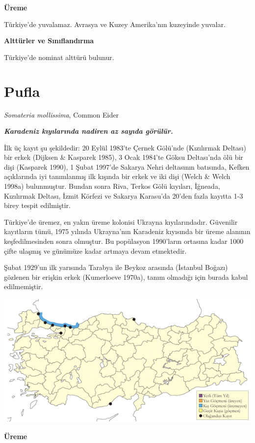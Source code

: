 \documentclass[
  letterpaper,
  DIV=11,
  numbers=noendperiod]{scrreprt}
\begin{document}
\textbf{Üreme}

Türkiye'de yuvalamaz. Avrasya ve Kuzey Amerika'nın kuzeyinde yuvalar.

\textbf{Alttürler ve Sınıflandırma}

Türkiye'de nominat alttürü bulunur.

\section{Pufla}\label{pufla}

\emph{Somateria mollissima}, Common Eider

\textbf{\emph{Karadeniz kıyılarında nadiren az sayıda görülür.}}

İlk üç kayıt şu şekildedir: 20 Eylül 1983'te Çernek Gölü'nde (Kızılırmak
Deltası) bir erkek (Dijksen \& Kasparek 1985), 3 Ocak 1984'te Göksu
Deltası'nda ölü bir dişi (Kasparek 1990), 1 Şubat 1997'de Sakarya Nehri
deltasının batısında, Kefken açıklarında iyi tanımlanmış ilk kışında bir
erkek ve iki dişi (Welch \& Welch 1998a) bulunmuştur. Bundan sonra Riva,
Terkos Gölü kıyıları, İğneada, Kızılırmak Deltası, İzmit Körfezi ve
Sakarya Karasu'da 20'den fazla kayıtta 1-3 birey tespit edilmiştir.

Türkiye'de üremez, en yakın üreme kolonisi Ukrayna kıyılarındadır.
Güvenilir kayıtların tümü, 1975 yılında Ukrayna'nın Karadeniz kıyısında
bir üreme alanının keşfedilmesinden sonra olmuştur. Bu popülasyon
1990'ların ortasına kadar 1000 çifte ulaşmış ve günümüze kadar artmaya
devam etmektedir.

Şubat 1929'un ilk yarısında Tarabya ile Beykoz arasında (İstanbul
Boğazı) gözlenen bir erişkin erkek (Kumerloeve 1970a), tanım olmadığı
için burada kabul edilmemiştir.

\includegraphics{images/harita_Page_027.png}

\textbf{Üreme}
\end{document}
